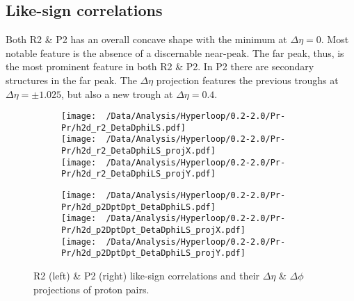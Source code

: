 \documentclass[12pt,a4paper,twoside]{report}
\begin{document}
\subsection{Like-sign correlations}
Both R2 \& P2 has an overall concave shape with the minimum at $\Delta\eta=0$. Most notable feature is the absence of a discernable near-peak. The far peak, thus, is the most prominent feature in both R2 \& P2. In P2 there are secondary structures in the far peak. The $\Delta\eta$ projection features the previous troughs at $\Delta\eta=\pm1.025$, but also a new trough at $\Delta\eta=0.4$.
\begin{figure}[H]
	\begin{subfigure}{0.49\linewidth}
		\texttt{[image: ~/Data/Analysis/Hyperloop/0.2-2.0/Pr-Pr/h2d\_r2\_DetaDphiLS.pdf]}\\
		\texttt{[image: ~/Data/Analysis/Hyperloop/0.2-2.0/Pr-Pr/h2d\_r2\_DetaDphiLS\_projX.pdf]}\\
		\texttt{[image: ~/Data/Analysis/Hyperloop/0.2-2.0/Pr-Pr/h2d\_r2\_DetaDphiLS\_projY.pdf]}\\
	\end{subfigure}
	\begin{subfigure}{0.49\linewidth}
		\texttt{[image: ~/Data/Analysis/Hyperloop/0.2-2.0/Pr-Pr/h2d\_p2DptDpt\_DetaDphiLS.pdf]}\\
		\texttt{[image: ~/Data/Analysis/Hyperloop/0.2-2.0/Pr-Pr/h2d\_p2DptDpt\_DetaDphiLS\_projX.pdf]}\\
		\texttt{[image: ~/Data/Analysis/Hyperloop/0.2-2.0/Pr-Pr/h2d\_p2DptDpt\_DetaDphiLS\_projY.pdf]}\\
	\end{subfigure}
	\caption{R2 (left) \& P2 (right) like-sign correlations and their $\Delta\eta$ \& $\Delta\phi$ projections of proton pairs.}
\end{figure}
\end{document}
